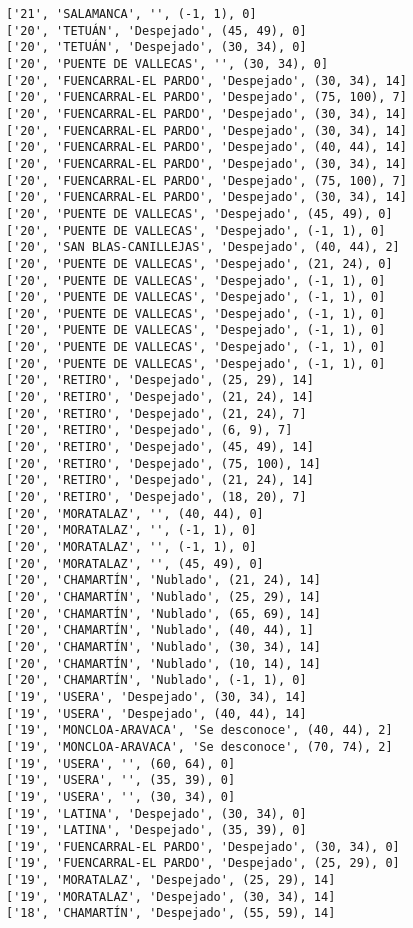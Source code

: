 \documentclass[11pt]{article}
\begin{document}
\begin{Verbatim}[commandchars=\\\{\}]
['21', 'SALAMANCA', '', (-1, 1), 0]
['20', 'TETUÁN', 'Despejado', (45, 49), 0]
['20', 'TETUÁN', 'Despejado', (30, 34), 0]
['20', 'PUENTE DE VALLECAS', '', (30, 34), 0]
['20', 'FUENCARRAL-EL PARDO', 'Despejado', (30, 34), 14]
['20', 'FUENCARRAL-EL PARDO', 'Despejado', (75, 100), 7]
['20', 'FUENCARRAL-EL PARDO', 'Despejado', (30, 34), 14]
['20', 'FUENCARRAL-EL PARDO', 'Despejado', (30, 34), 14]
['20', 'FUENCARRAL-EL PARDO', 'Despejado', (40, 44), 14]
['20', 'FUENCARRAL-EL PARDO', 'Despejado', (30, 34), 14]
['20', 'FUENCARRAL-EL PARDO', 'Despejado', (75, 100), 7]
['20', 'FUENCARRAL-EL PARDO', 'Despejado', (30, 34), 14]
['20', 'PUENTE DE VALLECAS', 'Despejado', (45, 49), 0]
['20', 'PUENTE DE VALLECAS', 'Despejado', (-1, 1), 0]
['20', 'SAN BLAS-CANILLEJAS', 'Despejado', (40, 44), 2]
['20', 'PUENTE DE VALLECAS', 'Despejado', (21, 24), 0]
['20', 'PUENTE DE VALLECAS', 'Despejado', (-1, 1), 0]
['20', 'PUENTE DE VALLECAS', 'Despejado', (-1, 1), 0]
['20', 'PUENTE DE VALLECAS', 'Despejado', (-1, 1), 0]
['20', 'PUENTE DE VALLECAS', 'Despejado', (-1, 1), 0]
['20', 'PUENTE DE VALLECAS', 'Despejado', (-1, 1), 0]
['20', 'PUENTE DE VALLECAS', 'Despejado', (-1, 1), 0]
['20', 'RETIRO', 'Despejado', (25, 29), 14]
['20', 'RETIRO', 'Despejado', (21, 24), 14]
['20', 'RETIRO', 'Despejado', (21, 24), 7]
['20', 'RETIRO', 'Despejado', (6, 9), 7]
['20', 'RETIRO', 'Despejado', (45, 49), 14]
['20', 'RETIRO', 'Despejado', (75, 100), 14]
['20', 'RETIRO', 'Despejado', (21, 24), 14]
['20', 'RETIRO', 'Despejado', (18, 20), 7]
['20', 'MORATALAZ', '', (40, 44), 0]
['20', 'MORATALAZ', '', (-1, 1), 0]
['20', 'MORATALAZ', '', (-1, 1), 0]
['20', 'MORATALAZ', '', (45, 49), 0]
['20', 'CHAMARTÍN', 'Nublado', (21, 24), 14]
['20', 'CHAMARTÍN', 'Nublado', (25, 29), 14]
['20', 'CHAMARTÍN', 'Nublado', (65, 69), 14]
['20', 'CHAMARTÍN', 'Nublado', (40, 44), 1]
['20', 'CHAMARTÍN', 'Nublado', (30, 34), 14]
['20', 'CHAMARTÍN', 'Nublado', (10, 14), 14]
['20', 'CHAMARTÍN', 'Nublado', (-1, 1), 0]
['19', 'USERA', 'Despejado', (30, 34), 14]
['19', 'USERA', 'Despejado', (40, 44), 14]
['19', 'MONCLOA-ARAVACA', 'Se desconoce', (40, 44), 2]
['19', 'MONCLOA-ARAVACA', 'Se desconoce', (70, 74), 2]
['19', 'USERA', '', (60, 64), 0]
['19', 'USERA', '', (35, 39), 0]
['19', 'USERA', '', (30, 34), 0]
['19', 'LATINA', 'Despejado', (30, 34), 0]
['19', 'LATINA', 'Despejado', (35, 39), 0]
['19', 'FUENCARRAL-EL PARDO', 'Despejado', (30, 34), 0]
['19', 'FUENCARRAL-EL PARDO', 'Despejado', (25, 29), 0]
['19', 'MORATALAZ', 'Despejado', (25, 29), 14]
['19', 'MORATALAZ', 'Despejado', (30, 34), 14]
['18', 'CHAMARTÍN', 'Despejado', (55, 59), 14]

\end{Verbatim}
\end{document}
